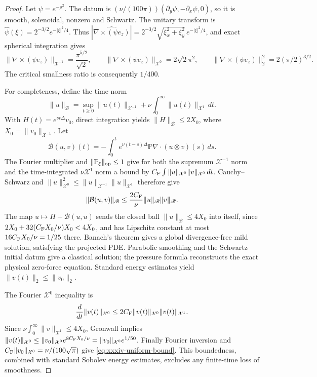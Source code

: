 \begin{proof}
Let $\psi=e^{-\rho^2}$. The datum is
$(\nu/(100\pi))(\partial_y\psi,-\partial_x\psi,0)$,
so it is smooth, solenoidal, nonzero and Schwartz.
The unitary transform is
$\widehat\psi(\xi)=2^{-3/2}e^{-|\xi|^2/4}$. Thus
$|\widehat{\nabla\times(\psi e_z)}|
=2^{-3/2}\sqrt{\xi_x^2+\xi_y^2}\,
 e^{-|\xi|^2/4}$, and exact spherical integration gives
\begin{equation}\label{eq:xxxiv-gaussian-norms}
\|\nabla\times(\psi e_z)\|_{\mathcal X^{-1}}
=\frac{\pi^{5/2}}{\sqrt2},\qquad
\|\nabla\times(\psi e_z)\|_{\mathcal X^0}
=2\sqrt2\pi^2,\qquad
\|\nabla\times(\psi e_z)\|_2^2
=2(\pi/2)^{3/2}.
\end{equation}
The critical smallness ratio is consequently $1/400$.

For completeness, define the time norm
\[
\|u\|_{\mathscr B}
=\sup_{t\ge0}\|u(t)\|_{\mathcal X^{-1}}
+\nu\int_0^\infty\|u(t)\|_{\mathcal X^1}\,dt.
\]
With $H(t)=e^{\nu t\Delta}v_0$, direct integration yields
$\|H\|_{\mathscr B}\le2X_0$, where
$X_0=\|v_0\|_{\mathcal X^{-1}}$.
Let
\[
\mathcal B(u,v)(t)=-
\int_0^t e^{\nu(t-s)\Delta}
\mathbb P\nabla\cdot(u\otimes v)(s)\,ds.
\]
The Fourier multiplier and $\|\mathbb P_\xi\|_{\rm op}\le1$
give for both the supremum $\mathcal X^{-1}$ norm and the
time-integrated $\nu\mathcal X^1$ norm a bound by
$C_{\rm F}\int\|u\|_{\mathcal X^0}
\|v\|_{\mathcal X^0}\,dt$.
Cauchy--Schwarz and
$\|u\|_{\mathcal X^0}^2
\le\|u\|_{\mathcal X^{-1}}\|u\|_{\mathcal X^1}$
therefore give
\[
\|\mathcal B(u,v)\|_{\mathscr B}
\le\frac{2C_{\rm F}}{\nu}
\|u\|_{\mathscr B}\|v\|_{\mathscr B}.
\]
The map $u\mapsto H+\mathcal B(u,u)$ sends the closed
ball $\|u\|_{\mathscr B}\le4X_0$ into itself, since
$2X_0+32(C_{\rm F}X_0/\nu)X_0<4X_0$,
and has Lipschitz constant at most
$16C_{\rm F}X_0/\nu=1/25$ there.
Banach's theorem gives a global divergence-free mild
solution, satisfying the projected PDE. Parabolic smoothing
and the Schwartz initial datum give a classical solution;
the pressure formula reconstructs the exact physical zero-force
equation. Standard energy estimates yield
$\|v(t)\|_2\le\|v_0\|_2$.

The Fourier $\mathcal X^0$ inequality is
\[
\frac{d}{dt}\|v(t)\|_{\mathcal X^0}
\le2C_{\rm F}
\|v(t)\|_{\mathcal X^0}\|v(t)\|_{\mathcal X^1}.
\]
Since $\nu\int_0^\infty\|v\|_{\mathcal X^1}
\le4X_0$, Gronwall implies
$\|v(t)\|_{\mathcal X^0}
\le\|v_0\|_{\mathcal X^0}
 e^{8C_{\rm F}X_0/\nu}
=\|v_0\|_{\mathcal X^0}e^{1/50}$.
Finally Fourier inversion and
$C_{\rm F}\|v_0\|_{\mathcal X^0}
=\nu/(100\sqrt\pi)$ give
\eqref{eq:xxxiv-uniform-bound}.
This boundedness, combined with standard Sobolev energy
estimates, excludes any finite-time loss of smoothness.
\end{proof}

